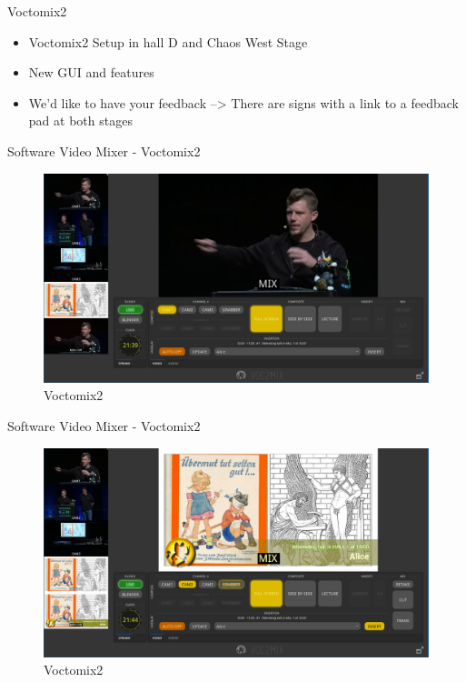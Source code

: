 \documentclass[aspectratio=169]{beamer}
\begin{document}
\begin{frame}{Voctomix2}%
	\begin{itemize}
		\item Voctomix2 Setup in hall D and Chaos West Stage
		\item New GUI and features
		\item We'd like to have your feedback --> There are signs with a link to a feedback pad at both stages 
	\end{itemize}
\end{frame}

\begin{frame}{Software Video Mixer - Voctomix2}%
	\begin{figure} 
		\centering
		\includegraphics[width=.9\textwidth]{images/voctomix2_1.png}%
		\caption{Voctomix2}
	\end{figure}
\end{frame}

\begin{frame}{Software Video Mixer - Voctomix2}%
	\begin{figure} 
		\centering
		\includegraphics[width=.9\textwidth]{images/voctomix2_2.png}%
		\caption{Voctomix2}
	\end{figure}
\end{frame}
\end{document}
